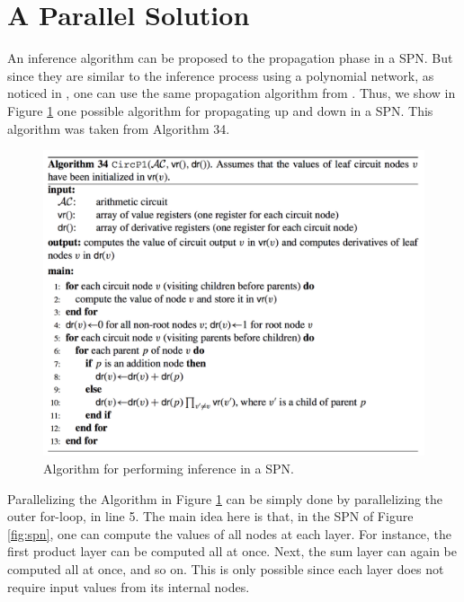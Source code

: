 \section{A Parallel Solution}
\label{sec:new}

An inference algorithm can be proposed to the propagation phase in a SPN.
But since they are similar to the inference process using a polynomial network, as noticed in \citep{Peharz:2015tp}, one can use the same propagation algorithm from \citep{Darwiche2009}.
Thus, we show in Figure \ref{fig:alg} one possible algorithm for propagating up and down in a SPN.
This algorithm was taken from \citep{Darwiche2009} Algorithm 34.

\begin{figure}[hbt]
    \begin{center}
    \includegraphics[width=\textwidth]{figures/alg.png}
    \caption{Algorithm \citep{Darwiche2009} for performing inference in a SPN.}
    \label{fig:alg}
    \end{center}
\end{figure}

Parallelizing the Algorithm in Figure \ref{fig:alg} can be simply done by parallelizing the outer for-loop, in line 5.
The main idea here is that, in the SPN of Figure \ref{fig:spn}, one can compute the values of all nodes at each layer.
For instance, the first product layer can be computed all at once.
Next, the sum layer can again be computed all at once, and so on.
This is only possible since each layer does not require input values from its internal nodes.


